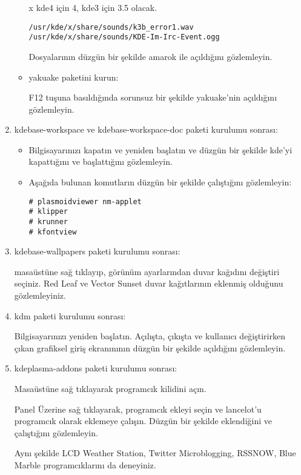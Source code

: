 \documentclass[a4paper,10pt]{article}
\begin{document}
\begin{enumerate}
\begin{itemize}
x kde4 için 4, kde3 için 3.5 olacak.
\begin{verbatim}
/usr/kde/x/share/sounds/k3b_error1.wav
/usr/kde/x/share/sounds/KDE-Im-Irc-Event.ogg
\end{verbatim}

Dosyalarının düzgün bir şekilde amarok ile açıldığını gözlemleyin.

\item yakuake paketini kurun:

F12 tuşuna basıldığında sorunsuz bir şekilde yakuake'nin açıldığını gözlemleyin.
\end{itemize}
\item kdebase-workspace ve kdebase-workspace-doc paketi kurulumu sonrası:
\begin{itemize}

 \item Bilgisayarınızı kapatın ve yeniden başlatın ve düzgün bir şekilde kde'yi kapattığını ve başlattığını gözlemleyin.

 \item Aşağıda bulunan komutların düzgün bir şekilde çalıştığını gözlemleyin:
\begin{verbatim}
# plasmoidviewer nm-applet 
# klipper
# krunner
# kfontview
\end{verbatim}

\end{itemize}

\item kdebase-wallpapers paketi kurulumu sonrası:

masaüstüne sağ tıklayıp, görünüm ayarlarından duvar kağıdını değiştiri seçiniz. Red Leaf ve Vector Sunset duvar kağıtlarının eklenmiş olduğunu gözlemleyiniz.

\item kdm paketi kurulumu sonrası:

Bilgisayarınızı yeniden başlatın. Açılışta, çıkışta ve kullanıcı değiştirirken çıkan grafiksel giriş ekranınının düzgün bir şekilde açıldığını gözlemleyin.

\item kdeplasma-addons paketi kurulumu sonrası:

Masaüstüne sağ tıklayarak programcık kilidini açın.

Panel Üzerine sağ tıklayarak, programcık ekleyi seçin ve lancelot'u programcık olarak eklemeye çalışın. Düzgün bir şekilde eklendiğini ve çalıştığını gözlemleyin.

Aynı şekilde LCD Weather Station, Twitter Microblogging, RSSNOW, Blue Marble programcıklarını da deneyiniz.


\end{enumerate}
\end{document}
